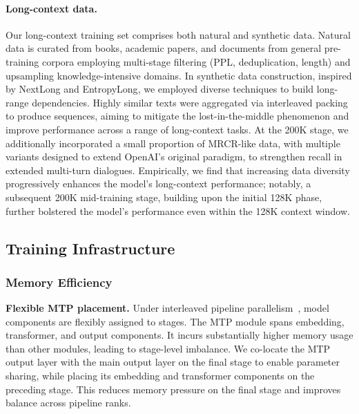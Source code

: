 \documentclass{article}
\theoremstyle{definition}
\begin{document}
\paragraph{Long-context data.} Our long-context training set comprises both natural and synthetic data. Natural data is curated from books, academic papers, and documents from general pre-training corpora employing multi-stage filtering (PPL, deduplication, length) and upsampling knowledge-intensive domains. In synthetic data construction, inspired by NextLong\cite{gao2025nextlongeffectivelongcontexttraining} and EntropyLong\cite{jia2025entropylongeffectivelongcontexttraining}, we employed diverse techniques to build long-range dependencies. Highly similar texts were aggregated via interleaved packing to produce sequences, aiming to mitigate the lost-in-the-middle phenomenon and improve performance across a range of long-context tasks. At the 200K stage, we additionally incorporated a small proportion of MRCR-like data, with multiple variants designed to extend OpenAI's original paradigm, to strengthen recall in extended multi-turn dialogues. Empirically, we find that increasing data diversity progressively enhances the model's long-context performance; notably, a subsequent 200K mid-training stage, building upon the initial 128K phase, further bolstered the model’s performance even within the 128K context window.

\subsection{Training Infrastructure}

\subsubsection{Memory Efficiency}

\textbf{Flexible MTP placement.} Under interleaved pipeline parallelism~\cite{narayanan2021efficientlargescalelanguagemodel}, model components are flexibly assigned to stages. The MTP module spans embedding, transformer, and output components. It incurs substantially higher memory usage than other modules, leading to stage-level imbalance. We co-locate the MTP output layer with the main output layer on the final stage to enable parameter sharing, while placing its embedding and transformer components on the preceding stage. This reduces memory pressure on the final stage and improves balance across pipeline ranks.
\end{document}

